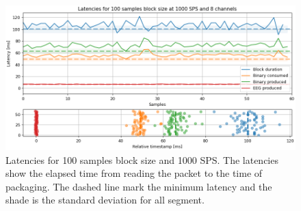 
\begin{figure}
\begin{centering}
% 
\includegraphics[width=1\textwidth]{Cap3/Figures/100ms1000sps_latencies.png}
\par\end{centering}
\caption[Latencies for 100 samples block size and 1000 SPS.]{Latencies for 100 samples block size and 1000 SPS. The latencies show the elapsed time from reading the packet to the time of packaging. The dashed line mark the minimum latency and the shade is the standard deviation for all segment.}
\label{fig:latencies_100ms}
\end{figure}